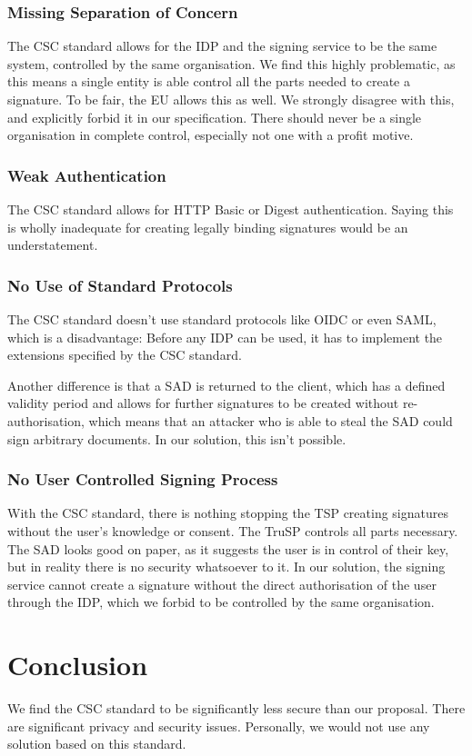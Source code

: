 \subsubsection{Missing Separation of Concern}
The \gls{CSC} standard allows for the \gls{IDP} and the signing service to be the same system,
controlled by the same organisation.
We find this highly problematic, as this means a single entity is able control all the parts needed to create a signature.
To be fair, the \gls{EU} allows this as well.
We strongly disagree with this, and explicitly forbid it in our specification.
There should never be a single organisation in complete control, especially not one with a profit motive.

\subsubsection{Weak Authentication}
The \gls{CSC} standard allows for \gls{HTTP} Basic or Digest authentication.
Saying this is wholly inadequate for creating legally binding signatures would be an understatement.

\subsubsection{No Use of Standard Protocols}
The \gls{CSC} standard doesn't use standard protocols like \gls{OIDC} or even \gls{SAML},
which is a disadvantage:
Before any \gls{IDP} can be used, it has to implement the extensions specified by the \gls{CSC} standard.

Another difference is that a \gls{SAD} is returned to the client,
which has a defined validity period and allows for further signatures to be created without re-authorisation,
which means that an attacker who is able to steal the \gls{SAD} could sign arbitrary documents.
In our solution, this isn't possible.

\subsubsection{No User Controlled Signing Process}
With the \gls{CSC} standard, there is nothing stopping the \gls{TSP} creating signatures without the user's knowledge or consent.
The \gls{TruSP} controls all parts necessary.
The \gls{SAD} looks good on paper,
as it suggests the user is in control of their key,
but in reality there is no security whatsoever to it.
In our solution, the signing service cannot create a signature without the direct authorisation of the user through the \gls{IDP},
which we forbid to be controlled by the same organisation.

\section{Conclusion}\label{sec:conclusion}
We find the \gls{CSC} standard to be significantly less secure than our proposal.
There are significant privacy and security issues.
Personally, we would not use any solution based on this standard.
